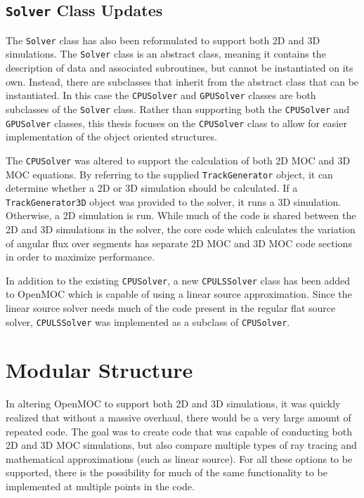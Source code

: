 \subsection{\texttt{Solver} Class Updates}
\label{sec:oo-solver}

The \texttt{Solver} class has also been reformulated to support both 2D and 3D simulations. The \texttt{Solver} class is an abstract class, meaning it contains the description of data and associated subroutines, but cannot be instantiated on its own. Instead, there are subclasses that inherit from the abstract class that can be instantiated. In this case the \texttt{CPUSolver} and \texttt{GPUSolver} classes are both subclasses of the \texttt{Solver} class. Rather than supporting both the \texttt{CPUSolver} and \texttt{GPUSolver} classes, this thesis focuses on the \texttt{CPUSolver} class to allow for easier implementation of the object oriented structures.

The \texttt{CPUSolver} was altered to support the calculation of both 2D \ac{MOC} and 3D \ac{MOC} equations. By referring to the supplied \texttt{TrackGenerator} object, it can determine whether a 2D or 3D simulation should be calculated. If a \texttt{TrackGenerator3D} object was provided to the solver, it runs a 3D simulation. Otherwise, a 2D simulation is run. While much of the code is shared between the 2D and 3D simulations in the solver, the core code which calculates the variation of angular flux over segments has separate 2D \ac{MOC} and 3D \ac{MOC} code sections in order to maximize performance.

In addition to the existing \texttt{CPUSolver}, a new \texttt{CPULSSolver} class has been added to OpenMOC which is capable of using a linear source approximation. Since the linear source solver needs much of the code present in the regular flat source solver, \texttt{CPULSSolver} was implemented as a subclass of \texttt{CPUSolver}.

\section{Modular Structure}
\label{sec:modular-structure}

In altering OpenMOC to support both 2D and 3D simulations, it was quickly realized that without a massive overhaul, there would be a very large amount of repeated code. The goal was to create code that was capable of conducting both 2D and 3D \ac{MOC} simulations, but also compare multiple types of ray tracing and mathematical approximations (such as linear source). For all these options to be supported, there is the possibility for much of the same functionality to be implemented at multiple points in the code.

